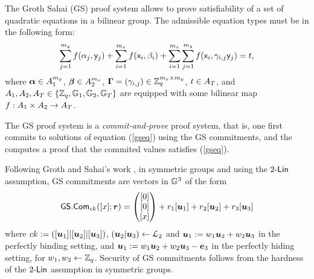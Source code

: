 The Groth Sahai (GS) proof system allows to prove satisfiability of a set of quadratic equations in a bilinear group. The admissible equation types must be in the following form:
\begin{equation}\label{gseq}
\sum_{j=1}^{m_y} f(\alpha_j, \mathsf{y}_j)+\sum_{i=1}^{m_x} f(\mathsf{x}_i, \beta_i)+\sum_{i=1}^{m_x} \sum_{j=1}^{m_y}  f(\mathsf{x}_i,\gamma_{i,j} \mathsf{y}_j)=t,
\end{equation}
 where $\boldsymbol \alpha  \in A_1^{m_y}$, $\boldsymbol \beta  \in A_2^{m_x}$, $\mathbf{{\Gamma}}=(\gamma_{i,j}) \in \mathbb{Z}_q^{m_x\times m_y}$, $t \in A_T$, and $A_1,A_2,A_T\in\{\mathbb{Z}_q,\mathbb{G}_1,\mathbb{G}_2,\mathbb{G}_T\}$ 
are equipped with some bilinear map $f:A_1\times A_2 \rightarrow A_T$.

The GS proof system is a \emph{commit-and-prove} proof system, that is, one first commits to solutions
of equation (\ref{gseq}) using the GS commitments, and the computes a proof that the commited values satisfies (\ref{gseq}).

Following Groth and Sahai's work \cite{EC:GroSah08}, in symmetric groups and using the $2\mbox{-}\mathsf{Lin}$ assumption, GS commitments are vectors in $\mathbb{G}^3$ of the form
$$
{\mathsf{GS}}.\mathsf{Com}_{ck}([x];{\boldsymbol{r}})=\left(\begin{matrix}{[0]}\\{[0]}\\{[x]}\end{matrix}\right)+r_1[{\boldsymbol{u}}_1]+{r}_2[{\boldsymbol{u}}_2]+r_3[{\boldsymbol{u}}_3]
$$
where $ck:=([{\boldsymbol{u}}_1]|[{\boldsymbol{u}}_2]|[{\boldsymbol{u}}_3])$, $({\boldsymbol{u}}_2|{\boldsymbol{u}}_3)\gets\mathcal{L}_2$ and ${\boldsymbol{u}}_1:=w_1{\boldsymbol{u}}_2+w_2{\boldsymbol{u}}_3$ in the perfectly binding setting, and ${\boldsymbol{u}}_1:=w_1{\boldsymbol{u}}_2+w_2{\boldsymbol{u}}_3-{\boldsymbol{e}}_3$ in the perfectly hiding setting, for $w_1,w_2\gets\mathbb{Z}_q$. Security of GS commitments follows from the hardness of the $2\mbox{-}\mathsf{Lin}$ assumption in symmetric groups.


